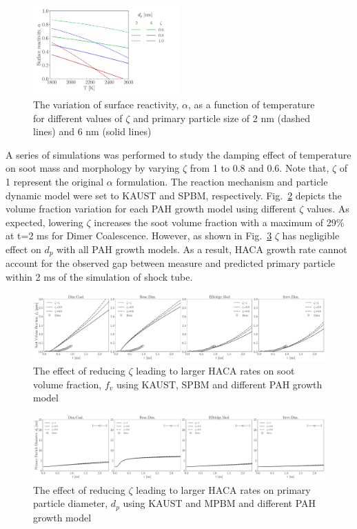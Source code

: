 \begin{figure}[H]
	\centering
	\includegraphics[width=0.5\textwidth]{Figures/Results/Shocktube/HACA/alpha.pdf}
	\caption{The variation of surface reactivity, $\alpha$, as a function of temperature for different values of $\zeta$ and primary particle size of 2 nm (dashed lines) and 6 nm (solid lines)}
	\label{fig:shocktube_alpha_HACA} 
\end{figure}

A series of simulations was performed to study the damping effect of temperature on soot mass and morphology by varying  $\zeta$ from 1 to 0.8 and 0.6. Note that, $\zeta$ of 1 represent the original $\alpha$ formulation. The reaction mechanism and particle dynamic model were set to KAUST and SPBM, respectively.
Fig.~\ref{fig:shocktube_vf_zetseffect} depicts the volume fraction variation for each PAH growth model using different $\zeta$ values. As expected, lowering $\zeta$ increases the soot volume fraction with a maximum of 29\% at t=2 ms for Dimer Coalescence. However, as shown in Fig.~\ref{fig:shocktube_dp_zetseffect} $\zeta$ has negligible effect on $d_p$ with all PAH growth models. As a result, HACA growth rate cannot account for the observed gap between measure and predicted primary particle within 2 ms of the simulation of shock tube.

\begin{figure}[H]
	\centering
	\includegraphics[width=1\textwidth]{Figures/Results/Shocktube/Stanford/TEM/10CH4_TEM_vf_HACAsens.pdf}
	\caption{The effect of reducing $\zeta$ leading to larger HACA rates on soot volume fraction, $f_v$ using KAUST, SPBM and different PAH growth model}
	\label{fig:shocktube_vf_zetseffect} 
\end{figure}


\begin{figure}[H]
	\centering
	\includegraphics[width=1\textwidth]{Figures/Results/Shocktube/Stanford/TEM/10CH4_TEM_dp_HACAsens.pdf}
	\caption{The effect of reducing $\zeta$ leading to larger HACA rates on primary particle diameter, $d_p$ using KAUST and MPBM and different PAH growth model}
	\label{fig:shocktube_dp_zetseffect} 
\end{figure}

